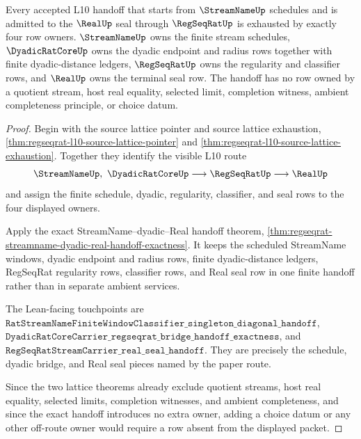 \begin{theorem}
\label{thm:regseqrat-streamname-real-handoff-exhaustion}
Every accepted L10 handoff that starts from $\StreamNameUp$ schedules and is admitted to the $\RealUp$ seal through $\RegSeqRatUp$ is exhausted by exactly four row owners. $\StreamNameUp$ owns the finite stream schedules, $\DyadicRatCoreUp$ owns the dyadic endpoint and radius rows together with finite dyadic-distance ledgers, $\RegSeqRatUp$ owns the regularity and classifier rows, and $\RealUp$ owns the terminal seal row. The handoff has no row owned by a quotient stream, host real equality, selected limit, completion witness, ambient completeness principle, or choice datum.
\end{theorem}
\begin{proof}
Begin with the source lattice pointer and source lattice exhaustion,
\autoref{thm:regseqrat-l10-source-lattice-pointer} and
\autoref{thm:regseqrat-l10-source-lattice-exhaustion}. Together they identify
the visible L10 route
$$
\StreamNameUp,\ \DyadicRatCoreUp \longrightarrow \RegSeqRatUp \longrightarrow \RealUp
$$
and assign the finite schedule, dyadic, regularity, classifier, and seal rows
to the four displayed owners.

Apply the exact StreamName--dyadic--Real handoff theorem,
\autoref{thm:regseqrat-streamname-dyadic-real-handoff-exactness}. It keeps the
scheduled StreamName windows, dyadic endpoint and radius rows, finite
dyadic-distance ledgers, RegSeqRat regularity rows, classifier rows, and Real
seal row in one finite handoff rather than in separate ambient services.

The Lean-facing touchpoints are
$\texttt{RatStreamNameFiniteWindowClassifier\_singleton\_diagonal\_handoff}$,
$\texttt{DyadicRatCoreCarrier\_regseqrat\_bridge\_handoff\_exactness}$, and
$\texttt{RegSeqRatStreamCarrier\_real\_seal\_handoff}$. They are precisely the
schedule, dyadic bridge, and Real seal pieces named by the paper route.

Since the two lattice theorems already exclude quotient streams, host real
equality, selected limits, completion witnesses, and ambient completeness, and
since the exact handoff introduces no extra owner, adding a choice datum or any
other off-route owner would require a row absent from the displayed packet.
\end{proof}

